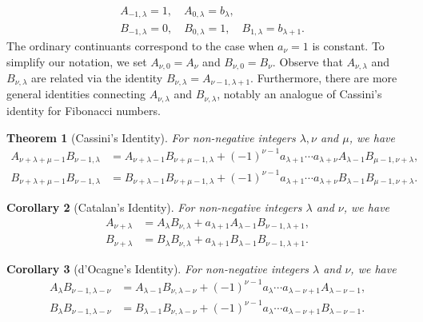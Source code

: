 \documentclass[12pt]{article}
\theoremstyle{plain}
\newtheorem{theorem}{Theorem}
\newtheorem{corollary}[theorem]{Corollary}
\theoremstyle{definition}
\theoremstyle{remark}
\begin{document}
\begin{align*}
	&A_{-1, \lambda} = 1, \quad A_{0, \lambda} = b_\lambda, \\
	&B_{-1, \lambda} = 0, \quad B_{0, \lambda} = 1, \quad B_{1, \lambda} = b_{\lambda + 1}.
\end{align*}
The ordinary continuants correspond to the case when $ a_\nu = 1 $ is constant. To simplify our notation, we set $ A_{\nu, 0} = A_\nu $ and $ B_{\nu, 0} = B_\nu $. Observe that $ A_{\nu, \lambda} $ and $ B_{\nu, \lambda} $ are related via the identity $ B_{\nu, \lambda} = A_{\nu - 1, \lambda + 1} $. Furthermore, there are more general identities connecting $ A_{\nu, \lambda} $ and $ B_{\nu, \lambda} $, notably an analogue of Cassini's identity for Fibonacci numbers.

\begin{theorem}[Cassini's Identity] \label{Th:Cassini_Identity} For non-negative integers $ \lambda, \nu $ and $ \mu $, we have
\begin{align*}	
	A_{\nu + \lambda + \mu - 1} B_{\nu - 1, \lambda} &= A_{\nu + \lambda - 1} B_{\nu + \mu - 1, \lambda} + (-1)^{\nu - 1} a_{\lambda + 1} \cdots a_{\lambda + \nu} A_{\lambda - 1} B_{\mu - 1, \nu + \lambda}, \\
	B_{\nu + \lambda + \mu - 1} B_{\nu - 1, \lambda} &= B_{\nu + \lambda - 1} B_{\nu + \mu - 1, \lambda} + (-1)^{\nu - 1} a_{\lambda + 1} \cdots a_{\lambda + \nu} B_{\lambda - 1} B_{\mu - 1, \nu + \lambda}.
\end{align*}
\end{theorem}

\begin{corollary}[Catalan's Identity] \label{Th:Catalan_Identity} For non-negative integers $ \lambda $ and $ \nu $, we have
\begin{align*}
	A_{\nu + \lambda} &= A_\lambda B_{\nu, \lambda} + a_{\lambda + 1} A_{\lambda - 1} B_{\nu - 1, \lambda + 1}, \\
	B_{\nu + \lambda} &= B_\lambda B_{\nu, \lambda} + a_{\lambda + 1} B_{\lambda - 1} B_{\nu - 1, \lambda + 1}.
	\end{align*}
\end{corollary}

\begin{corollary}[d'Ocagne's Identity] \label{Th:d'Ocagne_Identity} For non-negative integers $ \lambda $ and $ \nu $, we have
\begin{align*}
	A_\lambda B_{\nu - 1, \lambda - \nu} &= A_{\lambda - 1} B_{\nu, \lambda - \nu} + (-1)^{\nu - 1} a_\lambda \cdots a_{\lambda - \nu + 1} A_{\lambda - \nu - 1}, \\
	B_\lambda B_{\nu - 1, \lambda - \nu} &= B_{\lambda - 1} B_{\nu, \lambda - \nu} + (-1)^{\nu - 1} a_\lambda \cdots a_{\lambda - \nu + 1} B_{\lambda - \nu - 1}.
\end{align*}
\end{corollary}
\end{document}

